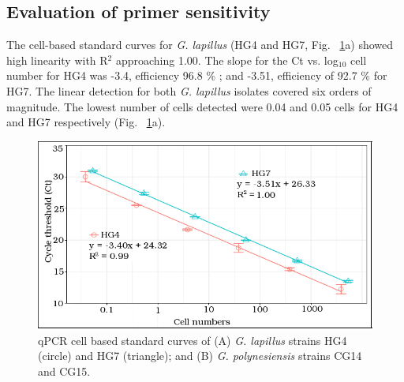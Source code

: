 \documentclass[12pt]{article}
\begin{document}
 
\subsection*{Evaluation of primer sensitivity}
\FloatBarrier
The cell-based standard curves for \emph{G. lapillus} (HG4 and HG7, Fig. ~\ref{fig:stdCurve}a) showed high linearity with R$^{2}$ approaching 1.00. 
The slope for the Ct vs. log$_{10}$ cell number for HG4  was -3.4, efficiency 96.8 \%%
; and -3.51, efficiency of 92.7 \% %
for HG7. The linear detection for both \emph{G. lapillus} isolates covered six orders of magnitude. 
The lowest number of cells detected were 0.04 and 0.05 cells for HG4 and HG7 respectively (Fig. ~\ref{fig:stdCurve}a).
\begin{figure}
\includegraphics[scale=.85]{Hero_qpcr-figs/Fig2_cell-based-stds-merged.png}
\caption{qPCR cell based standard curves of (A) \emph{G. lapillus} strains HG4 (circle) and HG7 (triangle); and (B) \emph{G. polynesiensis} strains CG14 and CG15.} %
\label{fig:stdCurve}
\end{figure}
\end{document}
